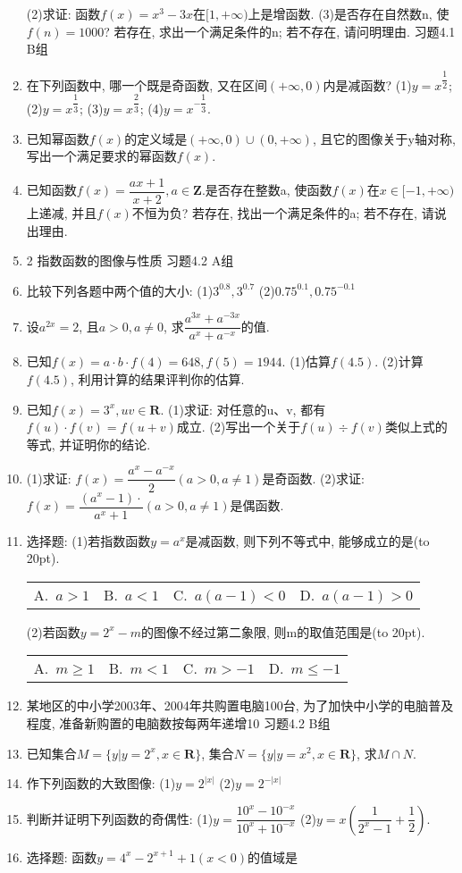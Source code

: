 \documentclass[10pt,a4paper]{article}
\newcommand{\bracket}[1]{(\hbox to #1pt{})}
\newcommand{\fourch}[4]{\par\begin{tabular}{p{.23\textwidth}p{.23\textwidth}p{.23\textwidth}p{.23\textwidth}}
A.~#1 &B.~#2& C.~#3& D.~#4
\end{tabular}}
\begin{document}
\begin{enumerate}[1.]
(2)求证: 函数$f(x)=x^3-3x$在$[1,+\infty)$上是增函数.
(3)是否存在自然数n, 使$f(n)=1000$? 若存在, 求出一个满足条件的n; 若不存在, 请问明理由.
习题4.1  B组
\item 在下列函数中, 哪一个既是奇函数, 又在区间$(+\infty ,0)$内是减函数?
(1)$y=x^{\dfrac 12}$; 		(2)$y=x^{\dfrac 13}$; 		(3)$y=x^{\dfrac 23}$; 		(4)$y=x^{-\dfrac 13}$.
\item 已知幂函数$f(x)$的定义域是$(+\infty ,0)\cup (0,+\infty)$, 且它的图像关于y轴对称, 写出一个满足要求的幂函数$f(x)$.
\item 已知函数$f(x)=\dfrac{ax+1}{x+2},a\in \mathbf{Z}$.是否存在整数a, 使函数$f(x)$在$x\in [-1,+\infty)$上递减, 并且$f(x)$不恒为负? 若存在, 找出一个满足条件的a; 若不存在, 请说出理由.
\item 2  指数函数的图像与性质
习题4.2  A组
\item 比较下列各题中两个值的大小:
(1)$3^{0.8},3^{0.7}$							(2)$0.75^{0.1},0.75^{-0.1}$
\item 设$a^{2x}=2$, 且$a>0,a\ne 0$, 求$\dfrac{{a^{3x}}+{a^{-3x}}}{{a^x}+{a^{-x}}}$的值.
\item 已知$f(x)=a\cdot b\cdot f(4)=648,f(5)=1944$.
(1)估算$f(4.5)$.
(2)计算$f(4.5)$, 利用计算的结果评判你的估算.
\item 已知$f(x)=3^x,uv\in \mathbf{R}$.
(1)求证: 对任意的u、v, 都有$f(u)\cdot f(v)=f(u+v)$成立.
(2)写出一个关于$f(u)\div f(v)$类似上式的等式, 并证明你的结论.
\item (1)求证: $f(x)=\dfrac{a^x-a^{-x}}2(a>0,a\ne 1)$是奇函数.
(2)求证: $f(x)=\dfrac{({a^x}-1)\cdot }{{a^x}+1}(a>0,a\ne 1)$是偶函数.
\item 选择题:
(1)若指数函数$y=a^x$是减函数, 则下列不等式中, 能够成立的是\bracket{20}.
\fourch{$a>1$}{$a<1$}{$a(a-1)<0$}{$a(a-1)>0$}
(2)若函数$y=2^x-m$的图像不经过第二象限, 则m的取值范围是\bracket{20}.
\fourch{$m\ge 1$}{$m<1$}{$m>-1$}{$m\le -1$}
\item 某地区的中小学2003年、2004年共购置电脑100台, 为了加快中小学的电脑普及程度, 准备新购置的电脑数按每两年递增10%
习题4.2  B组
\item 已知集合$M=\{y|y=2^x,x\in \mathbf{R}\}$, 集合$N=\{y|y=x^2,x\in \mathbf{R}\}$, 求$M\cap N$.
\item 作下列函数的大致图像:
(1)$y=2^{|x|}$							(2)$y=2^{-|x|}$
\item 判断并证明下列函数的奇偶性:
(1)$y=\dfrac{{{10}^x}-{{10}^{-x}}}{{{10}^x}+{{10}^{-x}}}$					(2)$y=x(\dfrac 1{2^x-1}+\dfrac 12)$.
\item 选择题:
函数$y=4^x-2^{x+1}+1(x<0)$的值域是

\end{enumerate}
\end{document}
